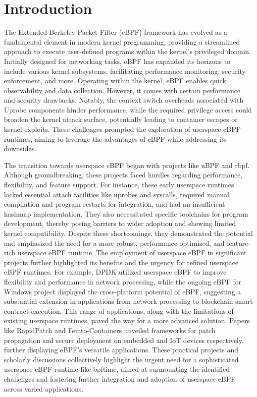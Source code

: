 \section{Introduction}
The Extended Berkeley Packet Filter (eBPF) framework has evolved as a fundamental element in modern kernel programming, providing a streamlined approach to execute user-defined programs within the kernel's privileged domain. Initially designed for networking tasks, eBPF has expanded its horizons to include various kernel subsystems, facilitating performance monitoring, security enforcement, and more. Operating within the kernel, eBPF enables quick observability and data collection. However, it comes with certain performance and security drawbacks. Notably, the context switch overheads associated with Uprobe components hinder performance, while the required privilege access could broaden the kernel attack surface, potentially leading to container escapes\cite{he2023cross} or kernel exploits\cite{lim2023unleashing}. These challenges prompted the exploration of userspace eBPF runtimes, aiming to leverage the advantages of eBPF while addressing its downsides.

The transition towards userspace eBPF began with projects like uBPF\cite{ubpf} and rbpf\cite{rbpf}. Although groundbreaking, these projects faced hurdles regarding performance, flexibility, and feature support. For instance, these early userspace runtimes lacked essential attach facilities like uprobes and syscalls, required manual compilation and program restarts for integration, and had an insufficient hashmap implementation. They also necessitated specific toolchains for program development, thereby posing barriers to wider adoption and showing limited kernel compatibility. Despite these shortcomings, they demonstrated the potential and emphasized the need for a more robust, performance-optimized, and feature-rich userspace eBPF runtime. The employment of userspace eBPF in significant projects further highlighted its benefits and the urgency for refined userspace eBPF runtimes. For example, DPDK utilized userspace eBPF to improve flexibility and performance in network processing\cite{dpdk-ebpf}, while the ongoing eBPF for Windows\cite{windows-ebpf} project displayed the cross-platform potential of eBPF, suggesting a substantial extension in applications from network processing to blockchain smart contract execution. This range of applications, along with the limitations of existing userspace runtimes, paved the way for a more advanced solution. Papers like RapidPatch\cite{he2022rapidpatch} and Femto-Containers\cite{zandberg2022femto} unveiled frameworks for patch propagation and secure deployment on embedded and IoT devices respectively, further displaying eBPF's versatile applications. These practical projects and scholarly discussions collectively highlight the urgent need for a sophisticated userspace eBPF runtime like bpftime, aimed at surmounting the identified challenges and fostering further integration and adoption of userspace eBPF across varied applications.

